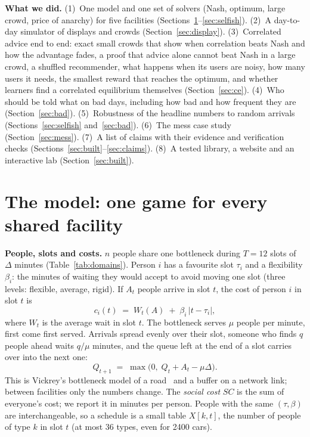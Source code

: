 \documentclass{article}
\begin{document}
\textbf{What we did.} (1)~One model and one set of solvers (Nash, optimum, large crowd, price of anarchy) for five
facilities (Sections~\ref{sec:model}--\ref{sec:selfish}). (2)~A day-to-day simulator of displays and crowds
(Section~\ref{sec:display}). (3)~Correlated advice end to end: exact small crowds that show when correlation beats Nash and how
the advantage fades, a proof that advice alone cannot beat Nash in a large crowd, a shuffled recommender, what happens
when its users are noisy, how many users it needs, the smallest reward that reaches the optimum, and whether learners
find a correlated equilibrium themselves (Section~\ref{sec:ce}). (4)~Who should be told what on bad days, including how
bad and how frequent they are (Section~\ref{sec:bad}). (5)~Robustness of the headline numbers to random arrivals
(Sections~\ref{sec:selfish} and~\ref{sec:bad}). (6)~The mess case study (Section~\ref{sec:mess}). (7)~A list of claims with their evidence and verification checks (Sections~\ref{sec:built}--\ref{sec:claims}). (8)~A tested library,
a website and an interactive lab (Section~\ref{sec:built}).

\section{The model: one game for every shared facility}\label{sec:model}
\textbf{People, slots and costs.} $n$ people share one bottleneck during $T=12$ slots of $\Delta$ minutes
(Table~\ref{tab:domains}). Person $i$ has a favourite slot $\tau_i$ and a flexibility $\beta_i$: the minutes of
waiting they would accept to avoid moving one slot (three levels: flexible, average, rigid). If $A_t$ people arrive in
slot $t$, the cost of person $i$ in slot $t$ is
\begin{equation}\label{eq:cost}
c_i(t) \;=\; W_t(A) \;+\; \beta_i\,|t-\tau_i| ,
\end{equation}
where $W_t$ is the average wait in slot $t$. The bottleneck serves $\mu$ people per minute, first come first served.
Arrivals spread evenly over their slot, someone who finds $q$ people ahead waits $q/\mu$ minutes, and the queue left
at the end of a slot carries over into the next one:
\begin{equation}\label{eq:queue}
Q_{t+1} \;=\; \max\bigl(0,\; Q_t + A_t - \mu\Delta\bigr).
\end{equation}
This is Vickrey's bottleneck model of a road~\cite{vickrey} and a buffer on a network link; between facilities only
the numbers change. The \emph{social cost} $SC$ is the sum of everyone's cost; we report it in minutes per person.
People with the same $(\tau,\beta)$ are interchangeable, so a schedule is a small table $X[k,t]$, the number of
people of type $k$ in slot $t$ (at most 36 types, even for 2400 cars).
\end{document}
